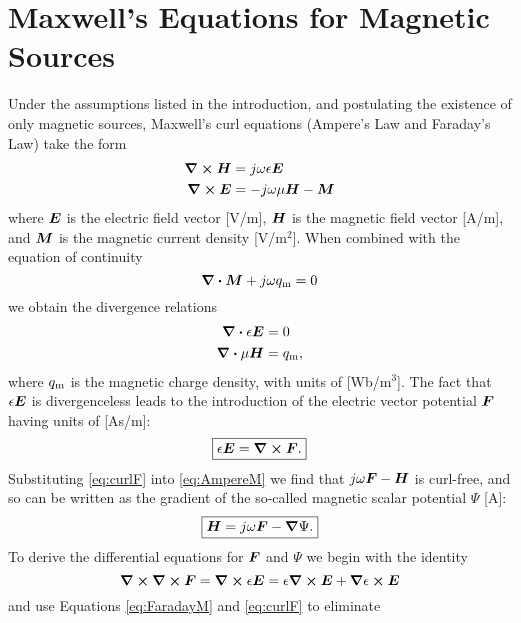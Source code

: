 \section{Maxwell's Equations for Magnetic Sources}
Under the assumptions listed in the introduction, and postulating the existence of only
magnetic sources, Maxwell's curl equations 
(Ampere's Law and Faraday's Law) take the form
\begin{subequations}
  \begin{align}
    \boldsymbol{\nabla} \boldsymbol{\times} \boldsymbol{H} &= j\omega\epsilon \boldsymbol{E} \label{eq:AmpereM} \\
    \boldsymbol{\nabla} \boldsymbol{\times} \boldsymbol{E} &= -j\omega\mu \boldsymbol{H} - \boldsymbol{M} \label{eq:FaradayM}
  \end{align}
\end{subequations}
where $\boldsymbol{E}$ is the electric field vector [V/m], $\boldsymbol{H}$ is the magnetic field
vector [A/m], and $\boldsymbol{M}$ is the magnetic current density [V/m$^2$].
When combined with the equation of continuity
\begin{equation}
  \boldsymbol{\nabla} \boldsymbol{\cdot} \boldsymbol{M} + j\omega q_{\text{m}} = 0
\end{equation}
we obtain the divergence relations
\begin{subequations}
  \begin{align}
    \boldsymbol{\nabla} \boldsymbol{\cdot} \epsilon\boldsymbol{E} &= 0  \label{eq:divEm}\\
    \boldsymbol{\nabla} \boldsymbol{\cdot} \mu\boldsymbol{H} &= q_{\text{m}},    \label{eq:divHm}
  \end{align}
\end{subequations}
where $q_{\text{m}}$ is the magnetic charge density,
with units of [Wb/m$^3$].
The fact that $\epsilon\boldsymbol{E}$ is divergenceless leads to 
the introduction of the electric vector potential $\boldsymbol{F}$
having units of [As/m]:
\begin{equation}
  \boxed{
  \epsilon\boldsymbol{E} = \boldsymbol{\nabla} \boldsymbol{\times} \boldsymbol{F}.  
  } \label{eq:curlF}
\end{equation}
Substituting \eqref{eq:curlF} into \eqref{eq:AmpereM} we find that
$j\omega\boldsymbol{F} - \boldsymbol{H}$ is curl-free, and so can be written as the gradient
of the so-called magnetic scalar potential $\Psi$ [A]:
\begin{equation}
  \label{eq:PsiM}
  \boxed{
  \boldsymbol{H} =  j\omega\boldsymbol{F} - \boldsymbol{\nabla}\Psi.
  }
\end{equation}
To derive the differential equations for $\boldsymbol{F}$ and $\Psi$ we
begin with the identity
\begin{equation}
  \boldsymbol{\nabla} \boldsymbol{\times} \boldsymbol{\nabla} \boldsymbol{\times} \boldsymbol{F} = \boldsymbol{\nabla} \boldsymbol{\times} \epsilon\boldsymbol{E} = \epsilon \boldsymbol{\nabla} \boldsymbol{\times} \boldsymbol{E} + \boldsymbol{\nabla}\epsilon \boldsymbol{\times} \boldsymbol{E}
\end{equation}
and use Equations \eqref{eq:FaradayM} and \eqref{eq:curlF} to eliminate
